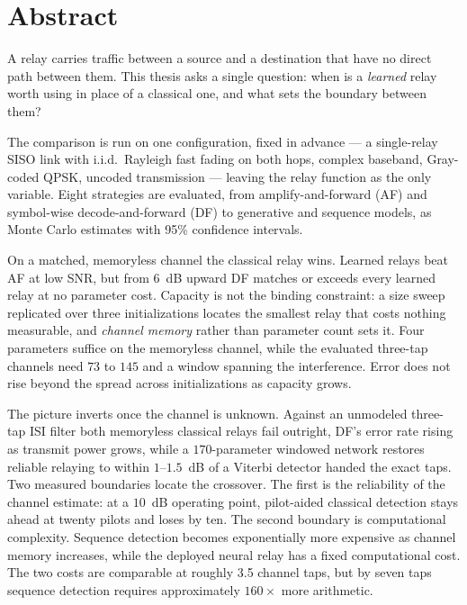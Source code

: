\chapter*{Abstract}

\label{sec:abstract-english}

A relay carries traffic between a source and a destination that have no direct path between them. This thesis asks a single question: when is a \emph{learned} relay worth using in place of a classical one, and what sets the boundary between them?

The comparison is run on one configuration, fixed in advance --- a single-relay SISO link with i.i.d.\ Rayleigh fast fading on both hops, complex baseband, Gray-coded QPSK, uncoded transmission --- leaving the relay function as the only variable. Eight strategies are evaluated, from amplify-and-forward (AF) and symbol-wise decode-and-forward (DF) to generative and sequence models, as Monte Carlo estimates with 95\% confidence intervals.

On a matched, memoryless channel the classical relay wins. Learned relays beat AF at low SNR, but from $6$~dB upward DF matches or exceeds every learned relay at no parameter cost. Capacity is not the binding constraint: a size sweep replicated over three initializations locates the smallest relay that costs nothing measurable, and \emph{channel memory} rather than parameter count sets it. Four parameters suffice on the memoryless channel, while the evaluated three-tap channels need $73$ to $145$ and a window spanning the interference. Error does not rise beyond the spread across initializations as capacity grows.

The picture inverts once the channel is unknown. Against an unmodeled three-tap ISI filter both memoryless classical relays fail outright, DF's error rate rising as transmit power grows, while a $170$-parameter windowed network restores reliable relaying to within $1$--$1.5$~dB of a Viterbi detector handed the exact taps. Two measured boundaries locate the crossover. The first is the reliability of the channel estimate: at a $10$~dB operating point, pilot-aided classical detection stays ahead at twenty pilots and loses by ten. The second boundary is computational complexity. Sequence detection becomes exponentially more expensive as channel memory increases, while the deployed neural relay has a fixed computational cost. The two costs are comparable at roughly 3.5 channel taps, but by seven taps sequence detection requires approximately $160\times$ more arithmetic.

